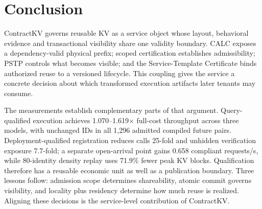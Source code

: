 \section{Conclusion}
\label{sec:conclusion}
ContractKV governs reusable KV as a service object whose layout, behavioral evidence and transactional visibility share one validity boundary. CALC exposes a dependency-valid physical prefix; scoped certification establishes admissibility; PSTP controls what becomes visible; and the Service-Template Certificate binds authorized reuse to a versioned lifecycle. This coupling gives the service a concrete decision about which transformed execution artifacts later tenants may consume.

The measurements establish complementary parts of that argument. Query-qualified execution achieves 1.070--1.619$\times$ full-cost throughput across three models, with unchanged IDs in all 1,296 admitted compiled future pairs. Deployment-qualified registration reduces calls 25-fold and unhidden verification exposure 7.7-fold; a separate open-arrival point gains 0.658 compliant requests/s, while 80-identity density replay uses 71.9\% fewer peak KV blocks. Qualification therefore has a reusable economic unit as well as a publication boundary. Three lessons follow: admission scope determines shareability, atomic commit governs visibility, and locality plus residency determine how much reuse is realized. Aligning these decisions is the service-level contribution of ContractKV.
